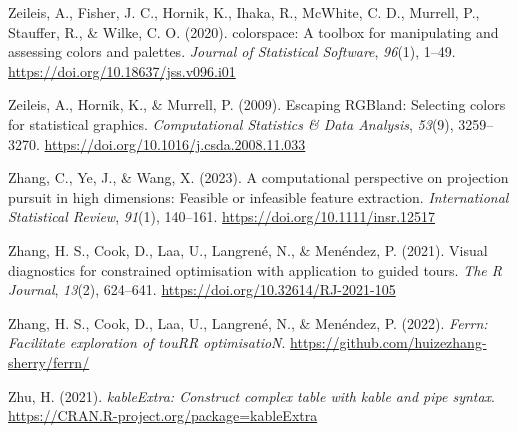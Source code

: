 \documentclass[
  letterpaper,
]{krantz}
\newlength{\cslhangindent}
\newlength{\cslentryspacingunit} %
\newenvironment{CSLReferences}[2] %
 {%
  \setlength{\parindent}{0pt}
  \ifodd #1
  \let\oldpar\par
  \def\par{\hangindent=\cslhangindent\oldpar}
  \fi
  \setlength{\parskip}{#2\cslentryspacingunit}
 }%
 {}
\begin{document}
\begin{CSLReferences}{1}{0}
\leavevmode{}%
Zeileis, A., Fisher, J. C., Hornik, K., Ihaka, R., McWhite, C. D.,
Murrell, P., Stauffer, R., \& Wilke, C. O. (2020). {colorspace}: A
toolbox for manipulating and assessing colors and palettes.
\emph{Journal of Statistical Software}, \emph{96}(1), 1--49.
\url{https://doi.org/10.18637/jss.v096.i01}

\leavevmode{}%
Zeileis, A., Hornik, K., \& Murrell, P. (2009). Escaping {RGB}land:
Selecting colors for statistical graphics. \emph{Computational
Statistics \& Data Analysis}, \emph{53}(9), 3259--3270.
\url{https://doi.org/10.1016/j.csda.2008.11.033}

\leavevmode{}%
Zhang, C., Ye, J., \& Wang, X. (2023). A computational perspective on
projection pursuit in high dimensions: Feasible or infeasible feature
extraction. \emph{International Statistical Review}, \emph{91}(1),
140--161. \url{https://doi.org/10.1111/insr.12517}

\leavevmode{}%
Zhang, H. S., Cook, D., Laa, U., Langrené, N., \& Menéndez, P. (2021).
Visual diagnostics for constrained optimisation with application to
guided tours. \emph{The R Journal}, \emph{13}(2), 624--641.
\url{https://doi.org/10.32614/RJ-2021-105}

\leavevmode{}%
Zhang, H. S., Cook, D., Laa, U., Langrené, N., \& Menéndez, P. (2022).
\emph{Ferrn: Facilitate exploration of touRR optimisatioN}.
\url{https://github.com/huizezhang-sherry/ferrn/}

\leavevmode{}%
Zhu, H. (2021). \emph{kableExtra: Construct complex table with kable and
pipe syntax}. \url{https://CRAN.R-project.org/package=kableExtra}

\end{CSLReferences}



\printindex
\end{document}

